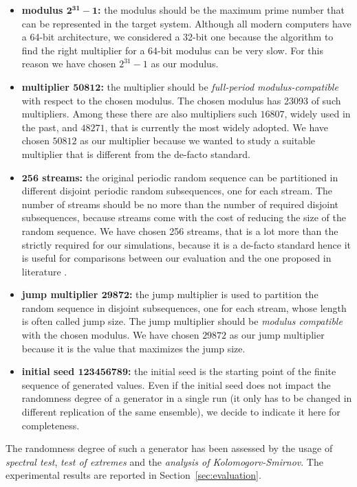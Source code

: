 \begin{itemize}
	\item \textbf{modulus $\mathbf{2^{31}-1}$:} the modulus should be the maximum prime number that can be represented in the target system. 
	Although all modern computers have a 64-bit architecture, we considered a 32-bit one because the algorithm to find the right multiplier for a 64-bit modulus can be very slow.
	For this reason we have chosen $2^{31}-1$ as our modulus.
	
	\item \textbf{multiplier $\mathbf{50812}$:} the multiplier should be \textit{full-period modulus-compatible} with respect to the chosen modulus. The chosen modulus has 23093 of such multipliers. Among these there are also multipliers such $16807$, widely used in the past, and $48271$, that is currently the most widely adopted.
	We have chosen $50812$ as our multiplier because we wanted to study a suitable multiplier that is different from the de-facto standard.
	
	\item \textbf{$\mathbf{256}$ streams:} the original periodic random sequence can be partitioned in different disjoint periodic random subsequences, one for each stream. 
	The number of streams should be no more than the number of required disjoint subsequences, because streams come with the cost of reducing the size of the random sequence.
	We have chosen 256 streams, that is a lot more than the strictly required for our simulations, because it is a de-facto standard hence it is useful for comparisons between our evaluation and the one proposed in literature \cite{leemis2006discrete}.
	
	\item \textbf{jump multiplier $\mathbf{29872}$:} the jump multiplier is used to partition the random sequence in disjoint subsequences, one for each stream, whose length is often called jump size. The jump multiplier should be \textit{modulus compatible} with the chosen modulus.
	We have chosen $29872$ as our jump multiplier because it is the value that maximizes the jump size.
	
	\item \textbf{initial seed $\mathbf{123456789}$:} the initial seed is the starting point of the finite sequence of generated values. Even if the initial seed does not impact the randomness degree of a generator in a single run (it only has to be changed in different replication of the same ensemble), we decide to indicate it here for completeness. 
\end{itemize}

The randomness degree of such a generator has been assessed by the usage of \textit{spectral test}, \textit{test of extremes} and the \textit{analysis of Kolomogorv-Smirnov}.
%
The experimental results are reported in Section~\ref{sec:evaluation}.
